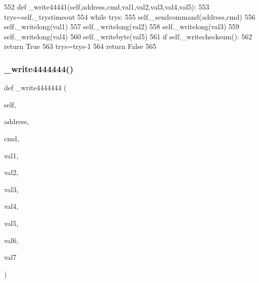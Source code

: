 \begin{DoxyCode}
552     \textcolor{keyword}{def }\_write44441(self,address,cmd,val1,val2,val3,val4,val5):
553         trys=self.\_trystimeout
554         \textcolor{keywordflow}{while} trys:
555             self.\_sendcommand(address,cmd)
556             self.\_writelong(val1)
557             self.\_writelong(val2)
558             self.\_writelong(val3)
559             self.\_writelong(val4)
560             self.\_writebyte(val5)
561             \textcolor{keywordflow}{if} self.\_writechecksum():
562                 \textcolor{keywordflow}{return} \textcolor{keyword}{True}
563             trys=trys-1
564         \textcolor{keywordflow}{return} \textcolor{keyword}{False}
565 
\end{DoxyCode}
\mbox{\label{classtoxic__hardware_1_1roboclaw__3_1_1Roboclaw_aa81bec5ecefa606fbf18f4549051f6aa}} 
\subsubsection{\texorpdfstring{\+\_\+write4444444()}{\_write4444444()}}
{\footnotesize\ttfamily def \+\_\+write4444444 (\begin{DoxyParamCaption}\item[{}]{self,  }\item[{}]{address,  }\item[{}]{cmd,  }\item[{}]{val1,  }\item[{}]{val2,  }\item[{}]{val3,  }\item[{}]{val4,  }\item[{}]{val5,  }\item[{}]{val6,  }\item[{}]{val7 }\end{DoxyParamCaption})\hspace{0.3cm}{\ttfamily [private]}}


